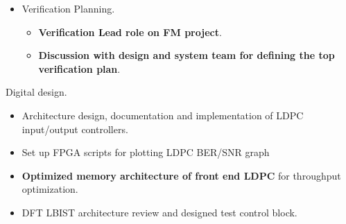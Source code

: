 \begin{cventries}
{\begin{cvitems}
\begin{itemize}
\begin{itemize}
            \item {Functional coverage: defined and implemented covergroups from verification plan}
          \end{itemize}
          \item {Verification Planning.}
          \begin{itemize}
            \item {\textbf{Verification Lead role on FM project}.}
            \item {\textbf{Discussion with design and system team for defining the top verification plan}.}
          \end{itemize}
        \end{itemize}
        \item {Digital design.}
        \begin{itemize}
          \item {Architecture design, documentation and implementation of LDPC input/output controllers.}
          \item {Set up FPGA scripts for plotting LDPC BER/SNR graph}
          \item {\textbf{Optimized memory architecture of front end LDPC} for throughput optimization.}
          \item {DFT LBIST architecture review and designed test control block.}
        \end{itemize}
      \end{cvitems}
    }



\end{cventries}
